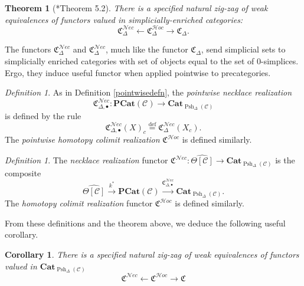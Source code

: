 \documentclass[leqno]{article}
\numberwithin{equation}{subsection}
\theoremstyle{plain}   %
\newtheorem{thm}[equation]{Theorem}
\newtheorem{cor}[equation]{Corollary}
\theoremstyle{remark}
\newtheorem{defn}[equation]{Definition}
\theoremstyle{plain}
\newcommand{\Nec}{\ensuremath{{\mathcal{N}ec}}}
\newcommand{\Hoc}{\ensuremath{{\mathcal{H}oc}}}
\newcommand{\Cat}{\ensuremath{\mathbf{Cat}}}
\renewcommand{\C}{\ensuremath{\mathcal{C}}}
\newcommand{\defeq}{\overset{\mathrm{def}}=}
\newcommand{\cellset}{\ensuremath{\widehat{\Theta[\mathcal{C}]}}}
\newcommand{\spsh}{\ensuremath{\operatorname{Psh}_\Delta(\mathcal{C})}}
\begin{document}
\begin{thm}[\cite{ds1}*{Theorem 5.2}]
	There is a specified natural zig-zag of weak equivalences of functors valued in simplicially-enriched categories:
	\[
		\mathfrak{C}^{\Nec}_\Delta \leftarrow \mathfrak{C}^{\Hoc}_\Delta \to \mathfrak{C}_\Delta.
	\]
\end{thm}

The functors \(\mathfrak{C}_\Delta^{\Nec}\) and \(\mathfrak{C}_\Delta^{\Nec}\), much like the functor \(\mathfrak{C}_\Delta\), send simplicial sets to simplicially enriched categories with set of objects equal to the set of \(0\)-simplices.  Ergo, they induce useful functor when applied pointwise to precategories.
\begin{defn}
	As in Definition \ref{pointwisedefn},  the \emph{pointwise necklace realization}
	\[
		\mathfrak{C}^{\Nec}_{\Delta,\bullet}:\mathbf{PCat}(\C) \to \Cat_{\spsh}
	\] 
	is defined by the rule
	\[
		\mathfrak{C}^{\Nec}_{\Delta,\bullet}(X)_c\defeq \mathfrak{C}^{\Nec}_{\Delta}(X_c).
	\]
	The \emph{pointwise homotopy colimit realization} \(\mathfrak{C}^{\Hoc}\) is defined similarly.  
\end{defn}

\begin{defn}
	The \emph{necklace realization} functor \(\mathfrak{C}^{\Nec}:\cellset \to \Cat_{\spsh}\) is the composite
	\[
		\cellset \xrightarrow{k^\ast} \mathbf{PCat}(\C) \xrightarrow{\mathfrak{C}^{\Nec}_{\Delta,\bullet}} \Cat_{\spsh}.
	\]
	The \emph{homotopy colimit realization} functor \(\mathfrak{C}^{\Hoc}\) is defined similarly.
\end{defn}

From these definitions and the theorem above, we deduce the following useful corollary.

\begin{cor}\label{necthm}
	There is a specified natural zig-zag of weak equivalences of functors valued in \(\Cat_{\spsh}\)
	\[
		\mathfrak{C}^{\Nec} \leftarrow \mathfrak{C}^{\Hoc} \to \mathfrak{C}
	\]
\end{cor}
\end{document}

